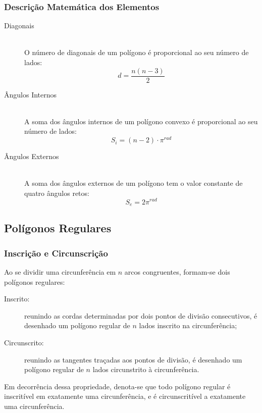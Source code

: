     \subsubsection{Descrição Matemática dos Elementos}
        \begin{description}
            \item[Diagonais] \hfill \\
                O número de diagonais de um polígono é proporcional ao seu número de lados:
                \[ d = \frac{n(n-3)}{2} \]
            \item[Ângulos Internos] \hfill \\
                A soma dos ângulos internos de um polígono convexo é proporcional ao seu número de lados:
                \[ S_i = (n-2) \cdot \pi^{rad} \]
            \item[Ângulos Externos] \hfill \\
                A soma dos ângulos externos de um polígono tem o valor constante de quatro ângulos retos:
                \[ S_e = 2\pi^{rad} \]
        \end{description}
\subsection{Polígonos Regulares}
    \subsubsection{Inscrição e Circunscrição}
        Ao se dividir uma circunferência em $n$ arcos congruentes, formam-se dois polígonos regulares:
        \begin{description}
            \item[Inscrito:] reunindo as cordas determinadas por dois pontos de divisão consecutivos, é desenhado um polígono regular de $n$ lados inscrito na circunferência;
            \item[Circunscrito:] reunindo as tangentes traçadas aos pontos de divisão, é desenhado um polígono regular de $n$ lados circunstrito à circunferência.
        \end{description}
        
        Em decorrência dessa propriedade, denota-se que todo polígono regular é inscritível em exatamente uma circunferência, e é circunscritível a exatamente uma circunferência.
